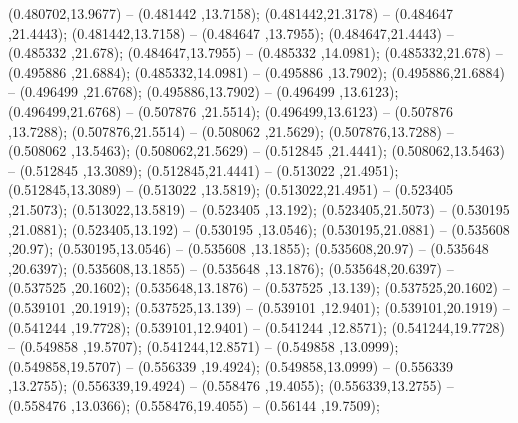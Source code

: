  (0.480702,13.9677) -- (0.481442 ,13.7158);
 (0.481442,21.3178) -- (0.484647 ,21.4443);
 (0.481442,13.7158) -- (0.484647 ,13.7955);
 (0.484647,21.4443) -- (0.485332 ,21.678);
 (0.484647,13.7955) -- (0.485332 ,14.0981);
 (0.485332,21.678) -- (0.495886 ,21.6884);
 (0.485332,14.0981) -- (0.495886 ,13.7902);
 (0.495886,21.6884) -- (0.496499 ,21.6768);
 (0.495886,13.7902) -- (0.496499 ,13.6123);
 (0.496499,21.6768) -- (0.507876 ,21.5514);
 (0.496499,13.6123) -- (0.507876 ,13.7288);
 (0.507876,21.5514) -- (0.508062 ,21.5629);
 (0.507876,13.7288) -- (0.508062 ,13.5463);
 (0.508062,21.5629) -- (0.512845 ,21.4441);
 (0.508062,13.5463) -- (0.512845 ,13.3089);
 (0.512845,21.4441) -- (0.513022 ,21.4951);
 (0.512845,13.3089) -- (0.513022 ,13.5819);
 (0.513022,21.4951) -- (0.523405 ,21.5073);
 (0.513022,13.5819) -- (0.523405 ,13.192);
 (0.523405,21.5073) -- (0.530195 ,21.0881);
 (0.523405,13.192) -- (0.530195 ,13.0546);
 (0.530195,21.0881) -- (0.535608 ,20.97);
 (0.530195,13.0546) -- (0.535608 ,13.1855);
 (0.535608,20.97) -- (0.535648 ,20.6397);
 (0.535608,13.1855) -- (0.535648 ,13.1876);
 (0.535648,20.6397) -- (0.537525 ,20.1602);
 (0.535648,13.1876) -- (0.537525 ,13.139);
 (0.537525,20.1602) -- (0.539101 ,20.1919);
 (0.537525,13.139) -- (0.539101 ,12.9401);
 (0.539101,20.1919) -- (0.541244 ,19.7728);
 (0.539101,12.9401) -- (0.541244 ,12.8571);
 (0.541244,19.7728) -- (0.549858 ,19.5707);
 (0.541244,12.8571) -- (0.549858 ,13.0999);
 (0.549858,19.5707) -- (0.556339 ,19.4924);
 (0.549858,13.0999) -- (0.556339 ,13.2755);
 (0.556339,19.4924) -- (0.558476 ,19.4055);
 (0.556339,13.2755) -- (0.558476 ,13.0366);
 (0.558476,19.4055) -- (0.56144 ,19.7509);
